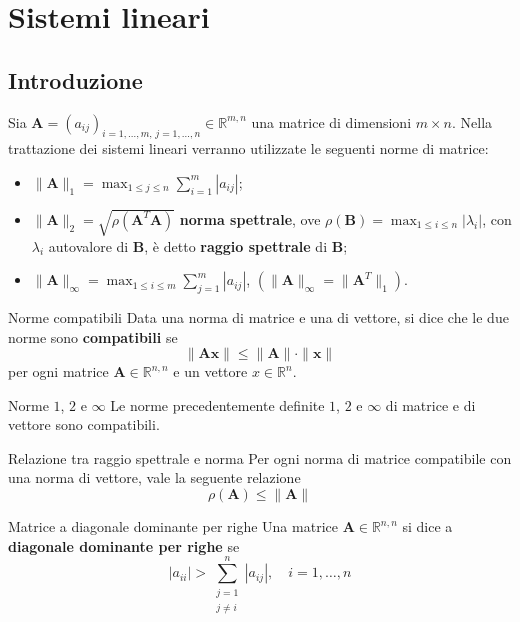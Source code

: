 \chapter{Sistemi lineari}

\section{Introduzione}

Sia $\mathbf{A}=(a_{ij})_{i=1,\dots,m,\,j=1,\dots,n}\in\mathbb{R}^{m,n}$ una matrice di dimensioni $m\times n$.
Nella trattazione dei sistemi lineari verranno utilizzate le seguenti norme di matrice:
\begin{itemize}
    \item $\|\mathbf{A}\|_1=\displaystyle\max_{1\leq j\leq n}\sum_{i=1}^m\left|a_{ij}\right|$;
    \item $\|\mathbf{A}\|_2=\sqrt{\rho(\mathbf{A}^T\mathbf{A})}$\textbf{ norma spettrale}, ove
    $\rho(\mathbf{B})=\displaystyle\max_{1\leq i\leq n}\left|\lambda_i\right|$, con $\lambda_i$
    autovalore di $\mathbf{B}$, è detto \textbf{raggio spettrale} di $\mathbf{B}$;
    \item $\|\mathbf{A}\|_\infty=\displaystyle\max_{1\leq i\leq m}\sum_{j=1}^m\left|a_{ij}\right|$,\qquad
    $\left(\|\mathbf{A}\|_\infty=\|\mathbf{A}^T\|_1\right)$.
\end{itemize}

\begin{definition}{Norme compatibili}
    Data una norma di matrice e una di vettore, si dice che le due norme sono \textbf{compatibili} se
    \[\|\mathbf{Ax}\|\leq\|\mathbf{A}\|\cdot\|\mathbf{x}\|\]
    per ogni matrice $\mathbf{A}\in\mathbb{R}^{n,n}$ e un vettore $x\in\mathbb{R}^n$.
\end{definition}

\begin{observation}{Norme $1$, $2$ e $\infty$}
    Le norme precedentemente definite $1$, $2$ e $\infty$ di matrice e di vettore sono compatibili.
\end{observation}

\begin{observation}{Relazione tra raggio spettrale e norma}
    Per ogni norma di matrice compatibile con una norma di vettore, vale la seguente relazione
    \[\rho(\mathbf{A})\leq\|\mathbf{A}\|\]
\end{observation}

\begin{definition}{Matrice a diagonale dominante per righe}
    Una matrice $\mathbf{A}\in\mathbb{R}^{n,n}$ si dice a \textbf{diagonale dominante per righe} se
    \[\left|a_{ii}\right|>\sum_{\substack{j=1\\j\ne i}}^n\left|a_{ij}\right|,\quad i=1,\dots,n\]
\end{definition}

